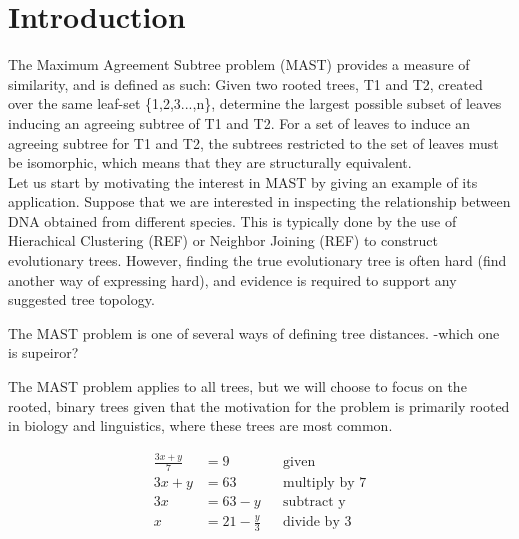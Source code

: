 \chapter{Introduction}
\label{ch:intro}
The Maximum Agreement Subtree problem (MAST) provides a  measure of similarity, and is defined as such: Given two rooted trees, T1 and T2, created over the same leaf-set \{1,2,3...,n\}, determine the largest possible subset of leaves inducing an agreeing subtree of T1 and T2. For a set of leaves to induce an agreeing subtree for T1 and T2, the subtrees restricted to the set of leaves must be isomorphic, which means that they are structurally equivalent.
\\

Let us start by motivating the interest in MAST by giving an example of its application. Suppose that we are interested in inspecting the relationship between DNA obtained from different species. This is typically done by the use of  Hierachical Clustering (REF) or Neighbor Joining (REF) to construct evolutionary trees. However, finding the true evolutionary tree is often hard (find another way of expressing hard), and evidence is required to support any suggested tree topology.  




The MAST problem is one of several ways of defining tree distances. -which one is supeiror?



The MAST problem applies to all trees, but we will choose to focus on the rooted, binary trees given that the motivation for the problem is primarily rooted in biology and linguistics, where these trees are most common.  


\begin{align*}
\frac{3x + y}{7} &= 9  && \text{given}   \\
3x + y &= 63           && \text{multiply by 7}   \\
3x &= 63 - y           && \text{subtract y}   \\
x &= 21 - \frac{y}{3}  && \text{divide by 3}   \\
\end{align*}


